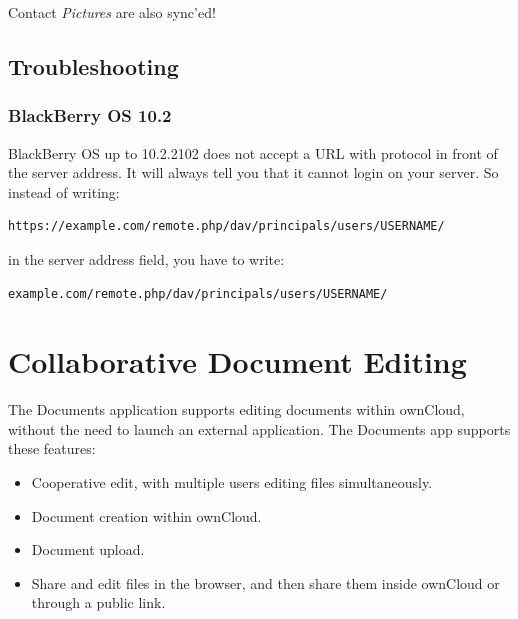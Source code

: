 \documentclass[letterpaper,10pt,english]{sphinxmanual}
\begin{document}
Contact \emph{Pictures} are also sync'ed!


\section{Troubleshooting}
\label{pim/troubleshooting::doc}\label{pim/troubleshooting:troubleshooting}

\subsection{BlackBerry OS 10.2}
\label{pim/troubleshooting:blackberry-os-10-2}
BlackBerry OS up to 10.2.2102 does not accept a URL with protocol 
in front of the server address. It will always tell you that it cannot login on
your server. So instead of writing:

\begin{Verbatim}[commandchars=\\\{\}]
https://example.com/remote.php/dav/principals/users/USERNAME/
\end{Verbatim}

in the server address field, you have to write:

\begin{Verbatim}[commandchars=\\\{\}]
example.com/remote.php/dav/principals/users/USERNAME/
\end{Verbatim}


\chapter{Collaborative Document Editing}
\label{documents:collaborative-document-editing}\label{documents::doc}
The Documents application supports editing documents within ownCloud, without
the need to launch an external application. The Documents app supports these
features:
\begin{itemize}
\item {} 
Cooperative edit, with multiple users editing files simultaneously.

\item {} 
Document creation within ownCloud.

\item {} 
Document upload.

\item {} 
Share and edit files in the browser, and then share them inside ownCloud or
through a public link.

\end{itemize}
\end{document}
